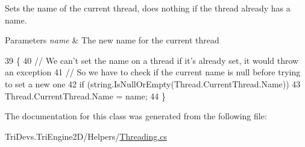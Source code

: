Sets the name of the current thread, does nothing if the thread already has a name. 


\begin{DoxyParams}{Parameters}
{\em name} & The new name for the current thread\\
\hline
\end{DoxyParams}

\begin{DoxyCode}
39         \{
40             \textcolor{comment}{// We can't set the name on a thread if it's already set, it would throw an exception}
41             \textcolor{comment}{// So we have to check if the current name is null before trying to set a new one}
42             \textcolor{keywordflow}{if} (\textcolor{keywordtype}{string}.IsNullOrEmpty(Thread.CurrentThread.Name))
43                 Thread.CurrentThread.Name = name;
44         \}
\end{DoxyCode}


The documentation for this class was generated from the following file\-:\begin{DoxyCompactItemize}
\item 
Tri\-Devs.\-Tri\-Engine2\-D/\-Helpers/\hyperlink{_threading_8cs}{Threading.\-cs}\end{DoxyCompactItemize}

